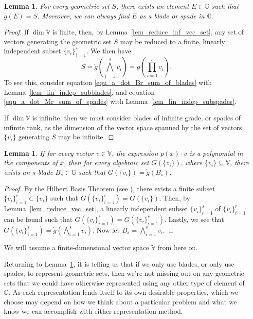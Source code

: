\documentclass{birkjour}
\newtheorem{lem}[thm]{Lemma}
\theoremstyle{definition}
\theoremstyle{remark}
\numberwithin{equation}{section}
\newcommand{\G}{\mathbb{G}}
\newcommand{\V}{\mathbb{V}}
\newcommand{\gd}{\dot{g}}
\begin{document}
\begin{lem}\label{lem_all_geo_sets_rep_by_blades_or_spades}
For every geometric set $S$, there exists an element $E\in\G$ such that $\gd(E)=S$.
Moreover, we can always find $E$ as a blade or spade in $\G$.
\end{lem}
\begin{proof}
If $\dim\V$ is finite, then, by Lemma~\ref{lem_reduce_inf_vec_set}, any set of vectors generating the geometric
set $S$ may be reduced to a finite, linearly independent subset $\{v_i\}_{i=1}^s$.
We then have
\begin{equation*}
S=\gd\left(\bigwedge_{i=1}^s v_i\right) = \gd\left(\prod_{i=1}^s v_i\right).
\end{equation*}
To see this, consider equation \eqref{equ_a_dot_Br_sum_of_blades} with Lemma~\ref{lem_lin_indep_subblades},
and equation \eqref{equ_a_dot_Mr_sum_of_spades} with Lemma~\ref{lem_lin_indep_subspades}.

If $\dim\V$ is infinite, then we must consider blades of infinite grade, or spades of infinite rank, as the dimension
of the vector space spanned by the set of vectors $\{v_i\}$ generating $S$ may be infinite.
\end{proof}

\begin{lem}
If for every vector $v\in\V$, the expression $p(x)\cdot v$ is a polynomial in the components of $x$,
then for every algebraic set $G(\{v_i\})$, where $\{v_i\}\subseteq\V$, there exists an $s$-blade $B_s\in\G$ such that
$G(\{v_i\})=\gd(B_s)$.
\end{lem}
\begin{proof}
By the Hilbert Basis Theorem (see \cite[p. 204]{Garrity13}), there exists a finite subset $\{v_i\}_{i=1}^r\subset\{v_i\}$
such that $G(\{v_i\}_{i=1}^r)=G(\{v_i\})$.  Then, by Lemma~\ref{lem_reduce_vec_set}, a linearly independent subset $\{v_i\}_{i=1}^s$
of $\{v_i\}_{i=1}^r$ can be found such that $G(\{v_i\}_{i=1}^s)=G(\{v_i\}_{i=1}^r)$.
Lastly, we see that $G(\{v_i\}_{i=1}^s)=\gd(\bigwedge_{i=1}^s v_i)$.  Now let $B_s=\bigwedge_{i=1}^s v_i$.
\end{proof}

We will assume a finite-dimensional vector space $\V$ from here on.

Returning to Lemma~\ref{lem_all_geo_sets_rep_by_blades_or_spades}, it is telling us that if we only use blades, or only use spades, to represent geometric sets,
then we're not missing out on any geometric sets
that we could have otherwise represented using any other type of element of $\G$.  As each representation lends
itself to its own desirable properties, which we choose may depend on how we think about a particular problem and what we know
we can accomplish with either representation method.
\end{document}
